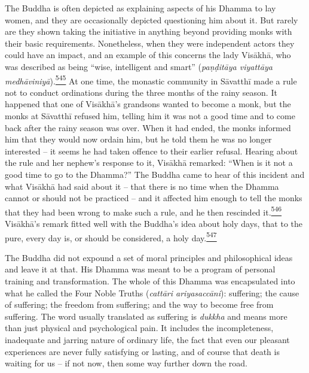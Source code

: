 The Buddha is often depicted as explaining aspects of his Dhamma to lay
women, and they are occasionally depicted questioning him about it. But
rarely are they shown taking the initiative in anything beyond providing
monks with their basic requirements. Nonetheless, when they were
independent actors they could have an impact, and an example of this
concerns the lady Visākhā, who was described as being ``wise,
intelligent and smart'' (\emph{paṇḍitāya viyattāya
medhāviniyā}).\label{footprints_split_014.html_fnref545}\hyperref[footprints_split_025.htmlux5cux23fn545]{\textsuperscript{545}}
At one time, the monastic community in Sāvatthī made a rule not to
conduct ordinations during the three months of the rainy season. It
happened that one of Visākhā's grandsons wanted to become a monk, but
the monks at Sāvatthī refused him, telling him it was not a good time
and to come back after the rainy season was over. When it had ended, the
monks informed him that they would now ordain him, but he told them he
was no longer interested -- it seems he had taken offence to their
earlier refusal. Hearing about the rule and her nephew's response to it,
Visākhā remarked: ``When is it not a good time to go to the Dhamma?''
The Buddha came to hear of this incident and what Visākhā had said about
it -- that there is no time when the Dhamma cannot or should not be
practiced -- and it affected him enough to tell the monks that they had
been wrong to make such a rule, and he then rescinded
it.\label{footprints_split_014.html_fnref546}\hyperref[footprints_split_025.htmlux5cux23fn546]{\textsuperscript{546}}
Visākhā's remark fitted well with the Buddha's idea about holy days,
that to the pure, every day is, or should be considered, a holy
day.\label{footprints_split_014.html_fnref547}\hyperref[footprints_split_025.htmlux5cux23fn547]{\textsuperscript{547}}

The Buddha did not expound a set of moral principles and philosophical
ideas and leave it at that. His Dhamma was meant to be a program of
personal training and transformation. The whole of this Dhamma was
encapsulated into what he called the Four Noble Truths (\emph{cattāri
ariyasaccāni}): suffering; the cause of suffering; the freedom from
suffering; and the way to become free from suffering. The word usually
translated as suffering is \emph{dukkha} and means more than just
physical and psychological pain. It includes the incompleteness,
inadequate and jarring nature of ordinary life, the fact that even our
pleasant experiences are never fully satisfying or lasting, and of
course that death is waiting for us -- if not now, then some way further
down the road.

